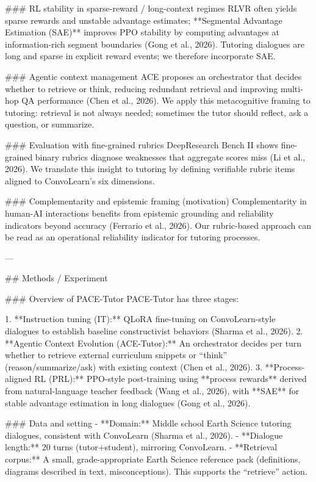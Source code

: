 ### RL stability in sparse-reward / long-context regimes  
RLVR often yields sparse rewards and unstable advantage estimates; **Segmental Advantage Estimation (SAE)** improves PPO stability by computing advantages at information-rich segment boundaries (Gong et al., 2026). Tutoring dialogues are long and sparse in explicit reward events; we therefore incorporate SAE.

### Agentic context management  
ACE proposes an orchestrator that decides whether to retrieve or think, reducing redundant retrieval and improving multi-hop QA performance (Chen et al., 2026). We apply this metacognitive framing to tutoring: retrieval is not always needed; sometimes the tutor should reflect, ask a question, or summarize.

### Evaluation with fine-grained rubrics  
DeepResearch Bench II shows fine-grained binary rubrics diagnose weaknesses that aggregate scores miss (Li et al., 2026). We translate this insight to tutoring by defining verifiable rubric items aligned to ConvoLearn’s six dimensions.

### Complementarity and epistemic framing (motivation)  
Complementarity in human-AI interactions benefits from epistemic grounding and reliability indicators beyond accuracy (Ferrario et al., 2026). Our rubric-based approach can be read as an operational reliability indicator for tutoring processes.

---

## Methods / Experiment  

### Overview of PACE-Tutor  
PACE-Tutor has three stages:

1. **Instruction tuning (IT):** QLoRA fine-tuning on ConvoLearn-style dialogues to establish baseline constructivist behaviors (Sharma et al., 2026).  
2. **Agentic Context Evolution (ACE-Tutor):** An orchestrator decides per turn whether to retrieve external curriculum snippets or “think” (reason/summarize/ask) with existing context (Chen et al., 2026).  
3. **Process-aligned RL (PRL):** PPO-style post-training using **process rewards** derived from natural-language teacher feedback (Wang et al., 2026), with **SAE** for stable advantage estimation in long dialogues (Gong et al., 2026).

### Data and setting  
- **Domain:** Middle school Earth Science tutoring dialogues, consistent with ConvoLearn (Sharma et al., 2026).  
- **Dialogue length:** 20 turns (tutor+student), mirroring ConvoLearn.  
- **Retrieval corpus:** A small, grade-appropriate Earth Science reference pack (definitions, diagrams described in text, misconceptions). This supports the “retrieve” action.  

